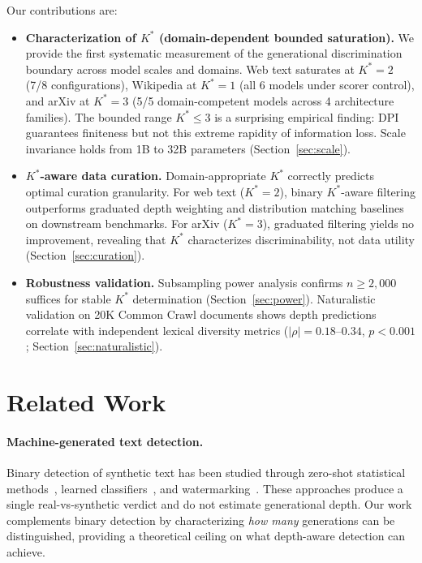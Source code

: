 \documentclass[11pt,a4paper]{article}
\begin{document}
Our contributions are:
\begin{itemize}
    \item \textbf{Characterization of $K^*$ (domain-dependent bounded saturation).} We provide the first systematic measurement of the generational discrimination boundary across model scales and domains. Web text saturates at $K^*\!=\!2$ (7/8 configurations), Wikipedia at $K^*\!=\!1$ (all 6 models under scorer control), and arXiv at $K^*\!=\!3$ (5/5 domain-competent models across 4 architecture families). The bounded range $K^* \le 3$ is a surprising empirical finding: DPI guarantees finiteness but not this extreme rapidity of information loss. Scale invariance holds from 1B to 32B parameters (Section~\ref{sec:scale}).
    \item \textbf{$K^*$-aware data curation.} Domain-appropriate $K^*$ correctly predicts optimal curation granularity. For web text ($K^*\!=\!2$), binary $K^*$-aware filtering outperforms graduated depth weighting and distribution matching baselines on downstream benchmarks. For arXiv ($K^*\!=\!3$), graduated filtering yields no improvement, revealing that $K^*$ characterizes discriminability, not data utility (Section~\ref{sec:curation}).
    \item \textbf{Robustness validation.} Subsampling power analysis confirms $n \ge 2{,}000$ suffices for stable $K^*$ determination (Section~\ref{sec:power}). Naturalistic validation on 20K Common Crawl documents shows depth predictions correlate with independent lexical diversity metrics ($|\rho| = 0.18$--$0.34$, $p < 0.001$; Section~\ref{sec:naturalistic}).
\end{itemize}


\section{Related Work}

\paragraph{Machine-generated text detection.}
Binary detection of synthetic text has been studied through zero-shot statistical methods~\citep{mitchell2023detectgpt,bao2024fastdetectgpt}, learned classifiers~\citep{zellers2019defending,solaiman2019release}, and watermarking~\citep{kirchenbauer2023watermark,zhao2023provable}. These approaches produce a single real-vs-synthetic verdict and do not estimate generational depth. Our work complements binary detection by characterizing \emph{how many} generations can be distinguished, providing a theoretical ceiling on what depth-aware detection can achieve.
\end{document}
